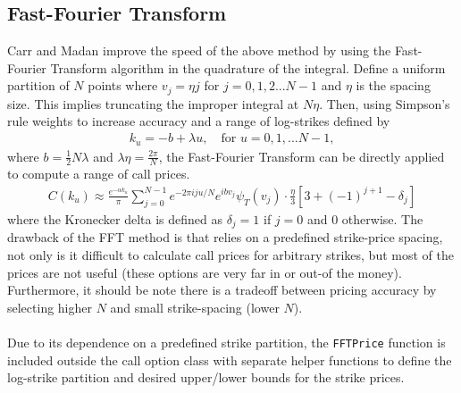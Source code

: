 \documentclass[11pt]{article}
\begin{document}
		\subsection{Fast-Fourier Transform}
		Carr and Madan improve the speed of the above method by using the Fast-Fourier Transform algorithm in the quadrature of the integral. Define a uniform partition of \( N \) points where \( v_{j} = \eta j \) for \( j = 0,1,2... N - 1 \) and \( \eta \) is the spacing size. This implies truncating the improper integral at \( N\eta \). Then, using Simpson's rule weights to increase accuracy and a range of log-strikes defined by
		\begin{align*}
		k_{u} = -b + \lambda u,\quad\text{for }u=0,1,...N-1,
		\end{align*}
		where \( b = \frac{1}{2}N\lambda \) and \( \lambda \eta = \frac{2\pi}{N} \), the Fast-Fourier Transform can be directly applied to compute a range of call prices. 
		\begin{align*}
		C(k_{u})\approx \frac{e^{-\alpha k_u}}{\pi}\sum_{j = 0}^{N-1}e^{-2\pi i j u/ N}e^{ibv_j}\psi_{T}(v_j)\cdot\frac{\eta}{3}\left[3 + (-1)^{j+1} - \delta_{j}\right]
		\end{align*}
		where the Kronecker delta is defined as \( \delta_{j} = 1 \) if \( j = 0 \) and \( 0 \) otherwise. The drawback of the FFT method is that relies on a predefined strike-price spacing, not only is it difficult to calculate call prices for arbitrary strikes, but most of the prices are not useful (these options are very far in or out-of the money). Furthermore, it should be note there is a tradeoff between pricing accuracy by selecting higher \( N \) and small strike-spacing (lower \( N \)).\\\\ Due to its dependence on a predefined strike partition, the \colorbox{gray!25}{\texttt{FFTPrice}} function is included outside the call option class with separate helper functions to define the log-strike partition and desired upper/lower bounds for the strike prices.
\end{document}
